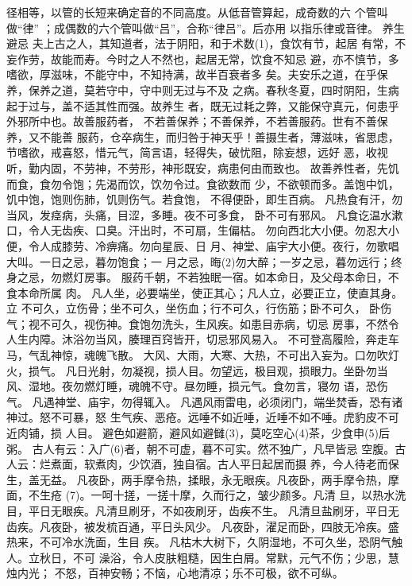 \documentclass[12pt,UTF8]{ctexbook}
\begin{document}
径相等，以管的长短来确定音的不同高度。从低音管算起，成奇数的六
个管叫做“律”
；成偶数的六个管叫做“吕”，合称“律吕”。后亦用
以指乐律或音律。
养生避忌
夫上古之人，其知道者，法于阴阳，和于术数(1)，食饮有节，起居
有常，不妄作劳，故能而寿。今时之人不然也，起居无常，饮食不知忌
避，亦不慎节，多嗜欲，厚滋味，不能守中，不知持满，故半百衰者多
矣。夫安乐之道，在乎保养，保养之道，莫若守中，守中则无过与不及
之病。春秋冬夏，四时阴阳，生病起于过与，盖不适其性而强。故养生
者，既无过耗之弊，又能保守真元，何患乎外邪所中也。故善服药者，
不若善保养；不善保养，不若善服药。世有不善保养，又不能善
服药，仓卒病生，而归咎于神天乎！善摄生者，薄滋味，省思虑，
节嗜欲，戒喜怒，惜元气，简言语，轻得失，破忧阻，除妄想，远好
恶，收视听，勤内固，不劳神，不劳形，神形既安，病患何由而致也。
故善养性者，先饥而食，食勿令饱；先渴而饮，饮勿令过。食欲数而
少，不欲顿而多。盖饱中饥，饥中饱，饱则伤肺，饥则伤气。若食饱，
不得便卧，即生百病。
凡热食有汗，勿当风，发痉病，头痛，目涩，多睡。夜不可多食，
卧不可有邪风。
凡食讫温水漱口，令人无齿疾、口臭。汗出时，不可扇，生偏枯。
勿向西北大小便。勿忍大小便，令人成膝劳、冷痹痛。勿向星辰、日
月、神堂、庙宇大小便。夜行，勿歌唱大叫。一日之忌，暮勿饱食；一
月之忌，晦(2)勿大醉；一岁之忌，暮勿远行；终身之忌，勿燃灯房事。
服药千朝，不若独眠一宿。如本命日，及父母本命日，不食本命所属
肉。
凡人坐，必要端坐，使正其心；凡人立，必要正立，使直其身。立
不可久，立伤骨；坐不可久，坐伤血；行不可久，行伤筋；卧不可久，
卧伤气；视不可久，视伤神。食饱勿洗头，生风疾。如患目赤病，切忌
房事，不然令人生内障。沐浴勿当风，腠理百窍皆开，切忌邪风易入。
不可登高履险，奔走车马，气乱神惊，魂魄飞散。
大风、大雨，大寒、大热，不可出入妄为。口勿吹灯火，损气。
凡日光射，勿凝视，损人目。勿望远，极目观，损眼力。坐卧勿当
风、湿地。夜勿燃灯睡，魂魄不守。昼勿睡，损元气。食勿言，寝勿
语，恐伤气。
凡遇神堂、庙宇，勿得辄入。
凡遇风雨雷电，必须闭门，端坐焚香，恐有诸神过。怒不可暴，怒
生气疾、恶疮。远唾不如近唾，近唾不如不唾。虎豹皮不可近肉铺，损
人目。
避色如避箭，避风如避雠(3)，莫吃空心(4)茶，少食申(5)后粥。
古人有云：入广(6)者，朝不可虚，暮不可实。然不独广，凡早皆忌
空腹。古人云：烂煮面，软煮肉，少饮酒，独自宿。古人平日起居而摄
养，今人待老而保生，盖无益。
凡夜卧，两手摩令热，揉眼，永无眼疾。凡夜卧，两手摩令热，摩
面，不生疮 (7)。一呵十搓，一搓十摩，久而行之，皱少颜多。凡清
旦，以热水洗目，平日无眼疾。凡清旦刷牙，不如夜刷牙，齿疾不生。
凡清旦盐刷牙，平日无齿疾。凡夜卧，被发梳百通，平日头风少。
凡夜卧，濯足而卧，四肢无冷疾。盛热来，不可冷水洗面，生目
疾。
凡枯木大树下，久阴湿地，不可久坐，恐阴气触人。立秋日，不可
澡浴，令人皮肤粗糙，因生白屑。常默，元气不伤；少思，慧烛内光；
不怒，百神安畅；不恼，心地清凉；乐不可极，欲不可纵。
\end{document}
